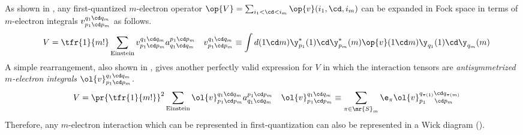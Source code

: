 \documentclass[11pt,fleqn]{article}
\numberwithin{equation}{section}
\begin{document}
\begin{rmk}
As shown in ,
any first-quantized $m$-electron operator
$
  \op{V}=\sum_{i_1<\cd<i_m}\op{v}(i_1,\cd, i_m)
$
can be expanded in Fock space in terms of $m$-electron integrals $v_{p_1\cd p_m}^{q_1\cd q_m}$ as follows.
\begin{align*}
&&
  V
=
  \tfr{1}{m!}
  \sum_{\text{Einstein}}
  v_{p_1\cd p_m}^{q_1\cd q_m}
  a^{p_1\cd p_m}_{q_1\cd q_m}
&&
  v_{p_1\cd p_m}^{q_1\cd q_m}
\equiv
  \int d(1\cd m)\y_{p_1}^*(1)\cd \y_{p_m}^*(m)\op{v}(1\cd m)\y_{q_1}(1)\cd \y_{q_m}(m)
\end{align*}
A simple rearrangement, also shown in , gives another perfectly valid expression for $V$ in which the interaction tensors are \textit{antisymmetrized $m$-electron integrals} $\ol{v}_{p_1\cd p_m}^{q_1\cd q_m}$.
\begin{align*}
&&
  V
=
  \pr{\tfr{1}{m!}}^2
  \sum_{\text{Einstein}}
  \ol{v}_{p_1\cd p_m}^{q_1\cd q_m}
  a^{p_1\cd p_m}_{q_1\cd q_m}
&&
  \ol{v}_{p_1\cd p_m}^{q_1\cd q_m}
\equiv
  \sum_{\pi\in\mr{S}_m}
  \e_{\pi}
  \ol{v}_{p_1\hphantom{_{\pi()}}\cd p_m}^{q_{\pi(1)}\cd q_{\pi(m)}}
\end{align*}
Therefore, any $m$-electron interaction which can be represented in first-quantization can also be represented in a Wick diagram ().
\end{rmk}
\end{document}
